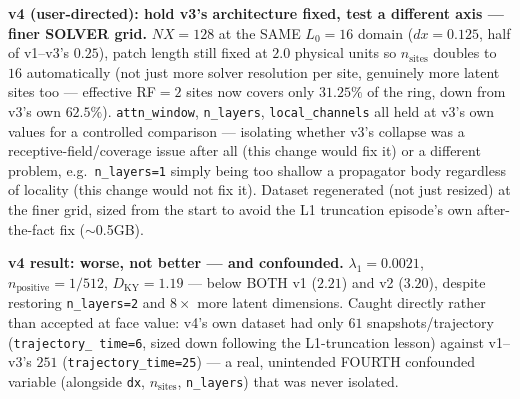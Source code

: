 \documentclass[11pt]{article}
\begin{document}
\textbf{v4 (user-directed): hold v3's architecture fixed, test a
different axis --- finer SOLVER grid.} $NX{=}128$ at the SAME
$L_0{=}16$ domain ($dx{=}0.125$, half of v1--v3's $0.25$), patch length
still fixed at $2.0$ physical units so $n_{\mathrm{sites}}$ doubles to
$16$ automatically (not just more solver resolution per site, genuinely
more latent sites too --- effective RF$=2$ sites now covers only
$31.25\%$ of the ring, down from v3's own $62.5\%$). \texttt{attn\_window},
\texttt{n\_layers}, \texttt{local\_channels} all held at v3's own values
for a controlled comparison --- isolating whether v3's collapse was a
receptive-field/coverage issue after all (this change would fix it) or a
different problem, e.g.\ \texttt{n\_layers=1} simply being too shallow a
propagator body regardless of locality (this change would not fix it).
Dataset regenerated (not just resized) at the finer grid, sized from the
start to avoid the L1 truncation episode's own after-the-fact fix
($\sim$0.5GB).

\textbf{v4 result: worse, not better --- and confounded.}
$\lambda_1=0.0021$, $n_{\mathrm{positive}}=1/512$,
$D_{\mathrm{KY}}=1.19$ --- below BOTH v1 ($2.21$) and v2 ($3.20$),
despite restoring \texttt{n\_layers=2} and $8\times$ more latent
dimensions. Caught directly rather than accepted at face value: v4's
own dataset had only $61$ snapshots/trajectory (\texttt{trajectory\_
time=6}, sized down following the L1-truncation lesson) against
v1--v3's $251$ (\texttt{trajectory\_time=25}) --- a real, unintended
FOURTH confounded variable (alongside \texttt{dx}, $n_{\mathrm{sites}}$,
\texttt{n\_layers}) that was never isolated.
\end{document}
